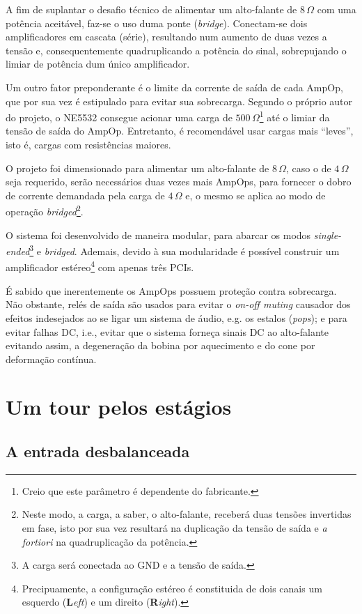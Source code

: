 \documentclass[12pt, a4paper, leqno, twoside]{book}
\def\ohm{\,\Omega}
\def\ampop{AmpOp}
\begin{document}
  A fim de suplantar o desafio t\'ecnico de alimentar um alto-falante de $8\ohm$ com uma pot\^encia aceit\'avel, faz-se o uso duma ponte ({\it bridge}). Conectam-se dois amplificadores em cascata (s\'erie), resultando num aumento de duas vezes a tens\~ao e, consequentemente quadruplicando a pot\^encia do sinal, sobrepujando o limiar de pot\^encia dum \'unico amplificador. 

  Um outro fator preponderante \'e o limite da corrente de sa\'ida de cada \ampop, que por sua vez \'e estipulado para evitar sua sobrecarga. Segundo o pr\'oprio autor do projeto, o NE5532 consegue acionar uma carga de $500\ohm$\footnote{Creio que este par\^ametro \'e dependente do fabricante.} at\'e o limiar da tens\~ao de sa\'ida do \ampop. Entretanto, \'e recomend\'avel usar cargas mais ``leves'', isto \'e, cargas com resist\^encias maiores. 

  O projeto foi dimensionado para alimentar um alto-falante de $8\ohm$, caso o de $4\ohm$ seja requerido, ser\~ao necess\'arios duas vezes mais \ampop{s}, para fornecer o dobro de corrente demandada pela carga de $4\ohm$ e, o mesmo se aplica ao modo de opera\c c\~ao {\it bridged\/}\footnote{Neste modo, a carga, a saber, o alto-falante, receber\'a duas tens\~oes invertidas em fase, isto por sua vez resultar\'a na duplica\c c\~ao da tens\~ao de sa\'ida e {\it a fortiori} na quadruplica\c c\~ao da pot\^encia.}. 

  O sistema foi desenvolvido de maneira modular, para abarcar os modos {\it single-ended\/}\footnote{A carga ser\'a conectada ao GND e a tens\~ao de sa\'ida.} e {\it bridged}. Ademais, devido \`a sua modularidade \'e poss\'ivel construir um amplificador est\'ereo\footnote{Precipuamente, a configura\c c\~ao est\'ereo \'e constituida de dois canais um esquerdo ({\bf L}{\it eft}) e um direito ({\bf R}{\it ight}).} com apenas tr\^es PCIs.

  \'E sabido que inerentemente os \ampop{s} possuem prote\c c\~ao contra sobrecarga. N\~ao obstante, rel\'es de sa\'ida s\~ao usados para evitar o {\it on-off muting} causador dos efeitos indesejados ao se ligar um sistema de \'audio, e.g. os estalos ({\it pops}); e para evitar falhas DC, i.e., evitar que o sistema forneça sinais DC ao alto-falante evitando assim, a degenera\c c\~ao da bobina por aquecimento e do cone por deforma\c c\~ao cont\'inua. 
  \section{Um tour pelos est\'agios}
  \subsection{A entrada desbalanceada}
\end{document}
